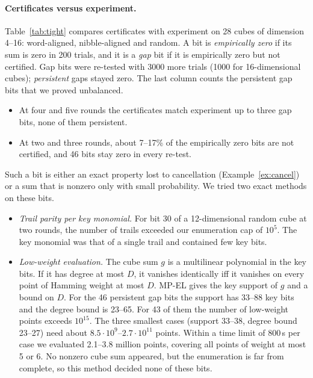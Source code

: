 \documentclass[11pt,a4paper]{article}
\theoremstyle{definition}
\theoremstyle{remark}
\newcommand{\MPEL}{\textsf{MP-EL}}
\begin{document}
\paragraph{Certificates versus experiment.} Table~\ref{tab:tight} compares certificates with experiment on 28 cubes of dimension 4--16: word-aligned, nibble-aligned and random. A bit is \emph{empirically zero} if its sum is zero in 200 trials, and it is a \emph{gap} bit if it is empirically zero but not certified. Gap bits were re-tested with 3000 more trials (1000 for 16-dimensional cubes); \emph{persistent} gaps stayed zero. The last column counts the persistent gap bits that we proved unbalanced.
\begin{itemize}
\item At four and five rounds the certificates match experiment up to three gap bits, none of them persistent.
\item At two and three rounds, about 7--17\% of the empirically zero bits are not certified, and 46 bits stay zero in every re-test.
\end{itemize}
Such a bit is either an exact property lost to cancellation (Example~\ref{ex:cancel}) or a sum that is nonzero only with small probability. We tried two exact methods on these bits.
\begin{itemize}
\item \emph{Trail parity per key monomial.} For bit 30 of a 12-dimensional random cube at two rounds, the number of trails exceeded our enumeration cap of $10^5$. The key monomial was that of a single trail and contained few key bits.
\item \emph{Low-weight evaluation.} The cube sum $g$ is a multilinear polynomial in the key bits. If it has degree at most $D$, it vanishes identically iff it vanishes on every point of Hamming weight at most $D$. \MPEL{} gives the key support of $g$ and a bound on $D$. For the 46 persistent gap bits the support has 33--88 key bits and the degree bound is 23--65. For 43 of them the number of low-weight points exceeds $10^{15}$. The three smallest cases (support 33--38, degree bound 23--27) need about $8.5\cdot10^9$--$2.7\cdot10^{11}$ points. Within a time limit of 800\,s per case we evaluated 2.1--3.8 million points, covering all points of weight at most 5 or 6. No nonzero cube sum appeared, but the enumeration is far from complete, so this method decided none of these bits.
\end{itemize}
\end{document}
